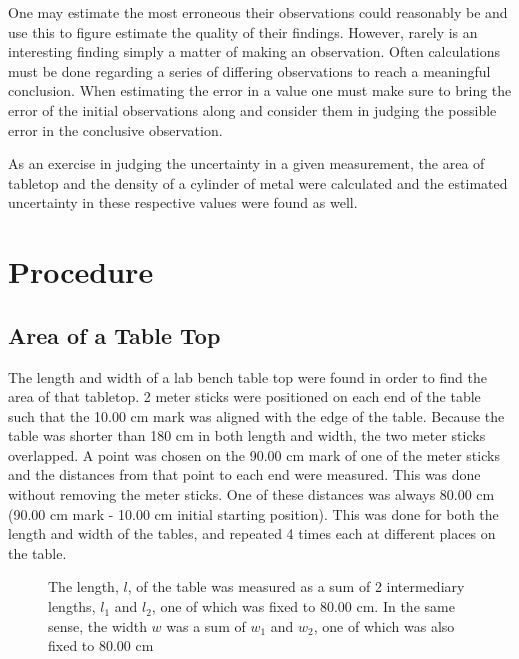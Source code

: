 \documentclass[11pt]{article}
\begin{document}
One may estimate the most erroneous their observations could reasonably be and use this to figure estimate the quality of their findings. However, rarely is an interesting finding simply a matter of making an observation. Often calculations must be done regarding a series of differing observations to reach a meaningful conclusion. When estimating the error in a value one must make sure to bring the error of the initial observations along and consider them in judging the possible error in the conclusive observation.

As an exercise in judging the uncertainty in a given measurement, the area of tabletop and the density of a cylinder of metal were calculated and the estimated uncertainty in these respective values were found as well.


\section{Procedure}
\subsection{Area of a Table Top}
The length and width of a lab bench table top were found in order to find the area of that tabletop. 2 meter sticks were positioned on each end of the table such that the 10.00 cm mark was aligned with the edge of the table. Because the table was shorter than 180 cm in both length and width, the two meter sticks overlapped. A point was chosen on the 90.00 cm mark of one of the meter sticks and the distances from that point to each end were measured. This was done without removing the meter sticks. One of these distances was always 80.00 cm (90.00 cm mark - 10.00 cm initial starting position). This was done for both the length and width of the tables, and repeated 4 times each at different places on the table.
\begin{figure}[h]
\centering
\caption{The length, \(l\), of the table was measured as a sum of 2 intermediary lengths, \(l_1\) and \(l_2\), one of which was fixed to 80.00 cm. In the same sense, the width \(w\) was a sum of \(w_1\) and \(w_2\), one of which was also fixed to 80.00 cm}
\end{figure}
\end{document}
